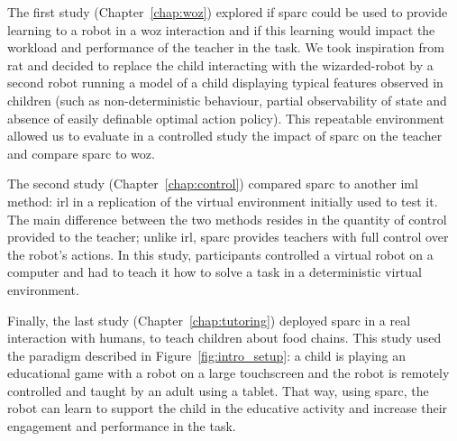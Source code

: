 The first study (Chapter~\ref{chap:woz}) explored if \gls{sparc} could be used to provide learning to a robot in a \gls{woz} interaction and if this learning would impact the workload and performance of the teacher in the task. We took inspiration from \gls{rat} and decided to replace the child interacting with the wizarded-robot by a second robot running a model of a child displaying typical features observed in children (such as non-deterministic behaviour, partial observability of state and absence of easily definable optimal action policy). This repeatable environment allowed us to evaluate in a controlled study the impact of \gls{sparc} on the teacher and compare \gls{sparc} to \gls{woz}.

The second study (Chapter~\ref{chap:control}) compared \gls{sparc} to another \gls{iml} method: \gls{irl} in a replication of the virtual environment initially used to test it. The main difference between the two methods resides in the quantity of control provided to the teacher; unlike \gls{irl}, \gls{sparc} provides teachers with full control over the robot's actions. In this study, participants controlled a virtual robot on a computer and had to teach it how to solve a task in a deterministic virtual environment.

Finally, the last study (Chapter~\ref{chap:tutoring}) deployed \gls{sparc} in a real interaction with humans, to teach children about food chains. This study used the paradigm described in Figure~\ref{fig:intro_setup}: a child is playing an educational game with a robot on a large touchscreen and the robot is remotely controlled and taught by an adult using a tablet. That way, using \gls{sparc}, the robot can learn to support the child in the educative activity and increase their engagement and performance in the task.

%
%
%
%
%

